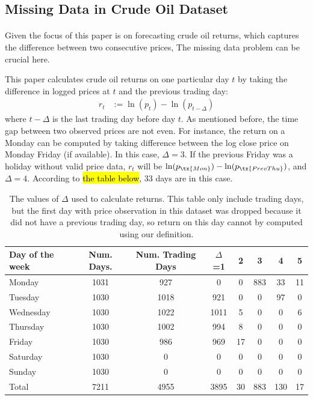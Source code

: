 \documentclass[12pt]{article}
\begin{document}
	\subsection{Missing Data in Crude Oil Dataset}
	\paragraph{} Given the focus of this paper is on forecasting crude oil returns, which captures the difference between two consecutive prices, The missing data problem can be crucial here.

	\par This paper calculates crude oil returns on one particular day $t$ by taking the difference in logged prices at $t$ and the previous trading day:
	\begin{align}
		r_t &:= \ln(p_t) - \ln(p_{t - \Delta})
	\end{align}
	where $t - \Delta$ is the last trading day before day $t$. As mentioned before, the time gap between two observed prices are not even. For instance, the return on a Monday can be computed by taking difference between the log close price on Monday Friday (if available). In this case, $\Delta = 3$. If the previous Friday was a holiday without valid price data, $r_t$ will be $\ln(p_\tx{Mon}) - \ln(p_{\tx{Prev Thu}})$, and $\Delta = 4$. According to \hl{the table below}, 33 days are in this case.
	\begin{table}[H]
		\centering
		\small
		\begin{tabular}{l|c c c c c c c}
			\toprule
			Day of the week & Num. Days. & Num. Trading Days & $\Delta$=1 & 2 & 3 & 4 & 5 \\
			\midrule
			Monday & 1031 & 927 & 0 & 0 & 883 & 33 & 11 \\
			Tuesday & 1030 & 1018 & 921 & 0 & 0 & 97 & 0 \\
			Wednesday & 1030 & 1022 & 1011 & 5 & 0 & 0 & 6 \\
			Thursday & 1030 & 1002 & 994 & 8 & 0 & 0 & 0 \\
			Friday & 1030 & 986 & 969 & 17 & 0 & 0 & 0 \\
			Saturday & 1030 & 0 & 0 & 0 & 0 & 0 & 0 \\
			Sunday & 1030 & 0 & 0 & 0 & 0 & 0 & 0 \\
			\midrule
			Total & 7211 & 4955 & 3895 & 30 & 883 & 130 & 17 \\
			\bottomrule
		\end{tabular}
		\caption{The values of $\Delta$ used to calculate returns. This table only include trading days, but the first day with price observation in this dataset was dropped because it did not have a previous trading day, so return on this day cannot by computed using our definition.}
	\end{table}
\end{document}
